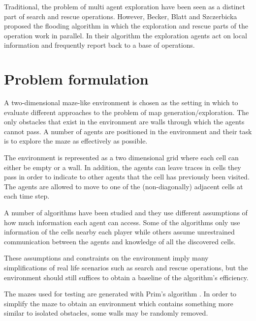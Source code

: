 \documentclass{article}
\begin{document}
Traditional, the problem of multi agent exploration have been seen as a
distinct part of search and rescue operations. However, Becker, Blatt and
Szczerbicka proposed the flooding algorithm \cite{becker2013multi} in which the
exploration and rescue parts of the operation work in parallel. In their
algorithm the exploration agents act on local information and frequently report
back to a base of operations.

\section{Problem formulation}
A two-dimensional maze-like environment is chosen as the setting in which to
evaluate different approaches to the problem of map generation/exploration.
The only obstacles that exist in the environment are walls through which the
agents cannot pass. A number of agents are positioned in the environment and
their task is to explore the maze as effectively as possible.

The environment is represented as a two dimensional grid where each cell can
either be empty or a wall. In addition, the agents can leave traces in cells
they pass in order to indicate to other agents that the cell has previously
been visited. The agents are allowed to move to one of the (non-diagonally)
adjacent cells at each time step. 

A number of algorithms have been studied and they use different assumptions of
how much information each agent can access. Some of the algorithms only use
information of the cells nearby each player while others assume unrestrained
communication between the agents and knowledge of all the discovered cells.

These assumptions and constraints on the environment imply many
simplifications of real life scenarios such as search and rescue operations,
but the environment should still suffices to obtain a baseline of the
algorithm's efficiency.

The mazes used for testing are generated with Prim's algorithm
\cite{prim1957shortest}. In order to simplify the maze to obtain an environment
which contains something more similar to isolated obstacles, some walls may be
randomly removed.
\end{document}
